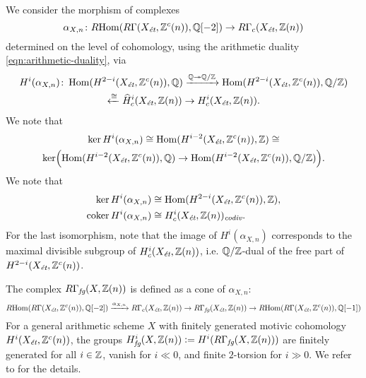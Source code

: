 \documentclass{article}
\numberwithin{equation}{section}
\begin{document}
We consider the morphism of complexes
\[ \alpha_{X,n}\colon \RHom (R\Gamma (X_\et, \ZZ^c(n)), \QQ [-2]) \to
  R\Gamma_c (X_\et, \ZZ(n)) \]
determined on the level of cohomology, using the arithmetic
duality \eqref{eqn:arithmetic-duality}, via
\begin{multline*}
  H^i (\alpha_{X,n})\colon \Hom (H^{2-i} (X_\et, \ZZ^c(n)), \QQ)
  \xrightarrow{\QQ \twoheadrightarrow \QQ/\ZZ}
  \Hom (H^{2-i} (X_\et, \ZZ^c(n)), \QQ/\ZZ)\\
  \xleftarrow{\cong} \widehat{H}^i_c (X_\et, \ZZ(n)) \to H^i_c (X_\et, \ZZ(n)).
\end{multline*}
We note that
\begin{multline*}
  \ker H^i (\alpha_{X,n}) \cong
  \Hom (H^{i-2} (X_\et, \ZZ^c(n)), \ZZ) \cong \\
  \ker \Bigl(\Hom (H^{i-2} (X_\et, \ZZ^c(n)), \QQ) \to
  \Hom (H^{i-2} (X_\et, \ZZ^c(n)), \QQ/\ZZ)\Bigr).
\end{multline*}
We note that
\begin{align*}
  \ker H^i (\alpha_{X,n}) & \cong \Hom (H^{2-i} (X_\et, \ZZ^c(n)), \ZZ), \\
  \coker H^i (\alpha_{X,n}) & \cong H^i_c (X_\et, \ZZ(n))_\codiv.
\end{align*}
For the last isomorphism, note that the image of $H^i (\alpha_{X,n})$
corresponds to the maximal divisible subgroup of $H^i_c (X_\et, \ZZ(n))$,
i.e. $\QQ/\ZZ$-dual of the free part of $H^{2-i} (X_\et, \ZZ^c(n))$.

The complex $R\Gamma_\fg (X, \ZZ(n))$ is defined as a cone of
$\alpha_{X,n}$:
\[ \RHom (R\Gamma (X_\et, \ZZ^c(n)), \QQ [-2]) \xrightarrow{\alpha_{X,n}}
  R\Gamma_c (X_\et, \ZZ(n)) \to
  R\Gamma_\fg (X_\et, \ZZ(n)) \to
  \RHom (R\Gamma (X_\et, \ZZ^c(n)), \QQ [-1]) \]
For a general arithmetic scheme $X$ with finitely generated motivic cohomology
$H^i (X_\et, \ZZ^c(n))$, the groups
$H^i_\fg (X, \ZZ(n)) \dfn H^i (R\Gamma_\fg (X, \ZZ(n)))$ are finitely generated
for all $i \in \ZZ$, vanish for $i \ll 0$, and finite $2$-torsion for $i \gg 0$.
We refer to \cite[\S 5]{Beshenov-Weil-etale-1} for the details.
\end{document}
